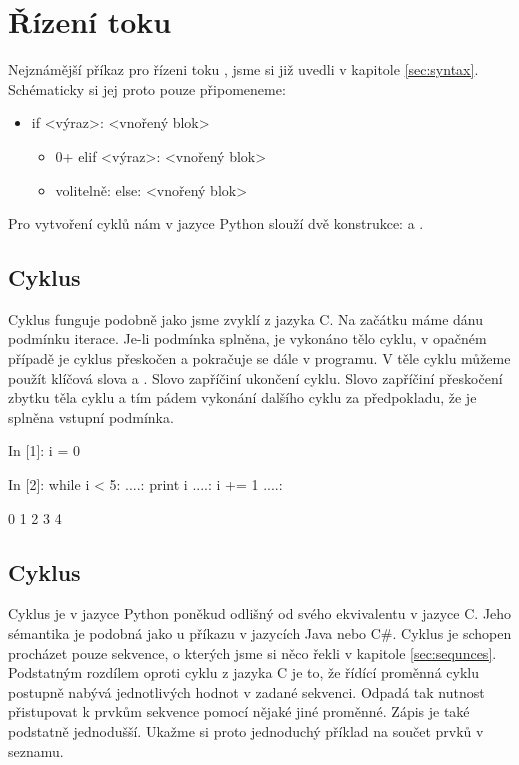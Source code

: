 \section{Řízení toku}

Nejznámější příkaz pro řízeni toku , jsme si již uvedli v kapitole \ref{sec:syntax}.
Schématicky si jej proto pouze připomeneme:

\begin{itemize}
    \item {\color{red}if} <výraz>: <vnořený blok>
    \begin{itemize}
        \item 0+ {\color{red}elif} <výraz>: <vnořený blok>
        \item volitelně: {\color{red}else}: <vnořený blok>
    \end{itemize}
\end{itemize}

Pro vytvoření cyklů nám v jazyce Python slouží dvě konstrukce:  a .

\subsection{Cyklus }

Cyklus  funguje podobně jako jsme zvyklí z jazyka C. Na začátku máme dánu podmínku iterace.
Je-li podmínka splněna, je vykonáno tělo cyklu, v opačném případě je cyklus přeskočen a pokračuje se dále
v programu. V těle cyklu můžeme použít klíčová slova  a . Slovo 
zapříčiní ukončení cyklu. Slovo  zapříčiní přeskočení zbytku těla cyklu a tím pádem
vykonání dalšího cyklu za předpokladu, že je splněna vstupní podmínka.


\begin{python}
In [1]: i = 0

In [2]: while i < 5:
   ....:     print i
   ....:     i += 1
   ....:     

0
1
2
3
4
\end{python}

\subsection{Cyklus } 

Cyklus  je v jazyce Python poněkud odlišný od svého ekvivalentu v jazyce C. Jeho sémantika je podobná jako
u příkazu  v jazycích Java nebo C\#. Cyklus  je schopen procházet pouze sekvence, o kterých
jsme si něco řekli v kapitole \ref{sec:sequnces}. Podstatným rozdílem oproti cyklu  z jazyka C je to, že
řídící proměnná cyklu postupně nabývá jednotlivých hodnot v zadané sekvenci. Odpadá tak nutnost přistupovat k prvkům
sekvence pomocí nějaké jiné proměnné. Zápis je také podstatně jednodušší. Ukažme si proto jednoduchý příklad na součet
prvků v seznamu.

